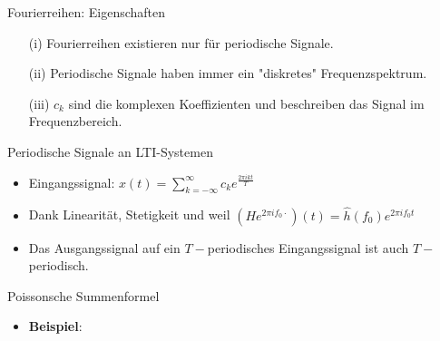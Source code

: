 \documentclass[14pt, aspectratio=169, handout]{beamer}
\begin{document}
\begin{frame}{Fourierreihen: Eigenschaften}
    \begin{itemize}
        \item[(i)] Fourierreihen existieren nur für periodische Signale.
        \item[] 
        \item[(ii)] Periodische Signale haben immer ein "diskretes" Frequenzspektrum.
        \item[] 
        \item[(iii)] $c_k$ sind die komplexen Koeffizienten und beschreiben das Signal im Frequenzbereich.
    \end{itemize}
\end{frame}

\begin{frame}{Periodische Signale an LTI-Systemen}
    \begin{itemize}
        \item Eingangssignal: $x(t) = \displaystyle\sum_{k = -\infty}^{\infty} c_k e^{\frac{2 \pi i k t}{T}}$
        \item[] 
        \item Dank Linearität, Stetigkeit und weil $\left(H \displaystyle e^{2 \pi i f_0 \cdot}\right)(t) = \hat{h}(f_0) e^{2 \pi i f_0 t}$
        \item[]
        \item[] %
    \item[] 
    \item Das Ausgangssignal auf ein $T-$periodisches Eingangssignal ist auch $T-$periodisch.
    \end{itemize}
\end{frame}

\begin{frame}{Poissonsche Summenformel}
%
    \begin{itemize}
        \item[] 
        \item \textbf{Beispiel}:
        \item[] 
        \item[] 
        \item[] 
        \item[] 
        \item[] 
    \end{itemize}
\end{frame}
\end{document}
